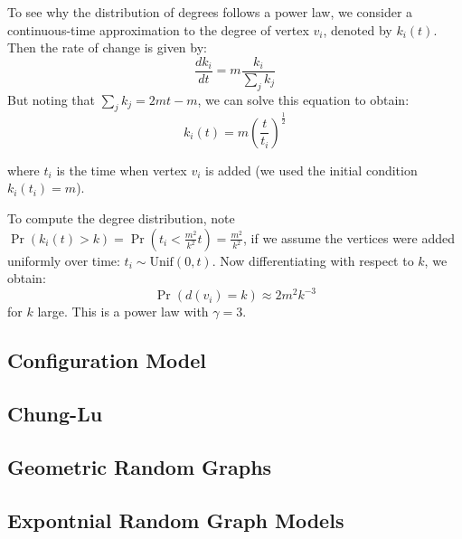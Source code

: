 \documentclass{article}
\begin{document}
\begin{unexaminable}
    To see why the distribution of degrees follows a power law, we consider a continuous-time approximation to the degree of vertex $v_i$, denoted by $k_i(t)$. Then the rate of change is given by:
    \begin{equation*}
        \frac{d k_i}{dt} = m \frac{k_i}{\sum_j k_j}
    \end{equation*}
    But noting that $\sum_j k_j = 2mt - m$, we can solve this equation  to obtain:
    \begin{equation*}
        k_i(t) = m \left( \frac{t}{t_i} \right)^{\frac{1}{2}}
    \end{equation*}

    where $t_i$ is the time when vertex $v_i$ is added (we used the initial condition $k_i(t_i)=m$).

    To compute the degree distribution, note $\Pr(k_i(t)>k) = \Pr(t_i < \frac{m^2}{k^2} t) = \frac{m^2}{k^2}$, if we assume the vertices were added uniformly over time: $t_i \sim \mathrm{Unif}(0,t)$. Now differentiating with respect to $k$, we obtain:
    \begin{equation*}
        \Pr(d(v_i)=k) \approx 2m^2 k^{-3}
    \end{equation*}
    for $k$ large. This is a power law with $\gamma=3$.
\end{unexaminable}



\subsection{Configuration Model}

\subsection{Chung-Lu}

\subsection{Geometric Random Graphs}

\subsection{Expontnial Random Graph Models}






\end{document}
